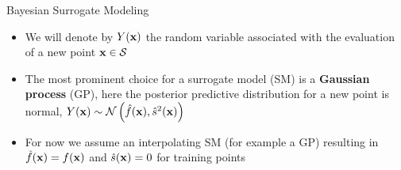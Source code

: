 \documentclass[11pt,compress,t,notes=noshow, xcolor=table]{beamer}
\begin{document}
\begin{vbframe}{Bayesian Surrogate Modeling}
\framebreak

\begin{itemize}
\item We will denote by $Y(\mathbf{x})$ the random variable associated with the evaluation of a new point $\mathbf{x} \in \mathcal{S}$
\item The most prominent choice for a surrogate model (SM) is a \textbf{Gaussian process} (GP), here the posterior predictive distribution for a new point is normal, $Y(\mathbf{x}) \sim \mathcal{N}\left(\hat{f}(\mathbf{x}), \hat{s}^2(\mathbf{x})\right)$
\item For now we assume an interpolating SM (for example a GP) resulting in $\hat{f}(\mathbf{x}) = f(\mathbf{x})$ and $\hat{s}(\mathbf{x}) = 0$ for training points
\end{itemize}

\end{vbframe} 
\end{document}
